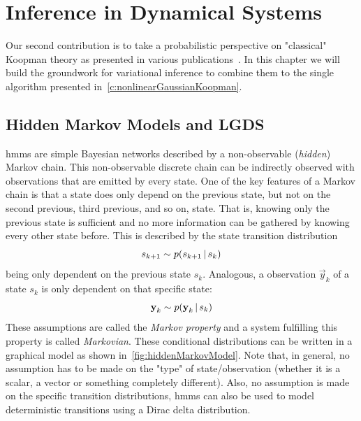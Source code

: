 \chapter{Inference in Dynamical Systems}
\label{c:inferenceInDynamicalSystems}



Our second contribution is to take a probabilistic perspective on "classical" Koopman theory as presented in various publications~\cite{bruntonKoopmanInvariantSubspaces2016,hanDeepLearningKoopman2020,kaiserDatadrivenDiscoveryKoopman2020,luschDeepLearningUniversal2018,williamsDataDrivenApproximation2015}. In this chapter we will build the groundwork for variational inference to combine them to the single \algname algorithm presented in~\autoref{c:nonlinearGaussianKoopman}.

\section{Hidden Markov Models and LGDS}
	\acp{hmm} are simple Bayesian networks described by a non-observable (\emph{hidden}) Markov chain. This non-observable discrete chain can be indirectly observed with observations that are emitted by every state. One of the key features of a Markov chain is that a state does only depend on the previous state, but not on the second previous, third previous, and so on, state. That is, knowing only the previous state is sufficient and no more information can be gathered by knowing every other state before. This is described by the state transition distribution
	\begin{equation*}
		s_{k + 1} \sim p(s_{k + 1} \,\vert\, s_k)
	\end{equation*}
	being only dependent on the previous state \(s_k\). Analogous, a observation \(\vec{y}_k\) of a state \(s_k\) is only dependent on that specific state:
	\begin{equation*}
		\boldsymbol{\mathrm{y}}_k \sim p(\boldsymbol{\mathrm{y}}_k \,\vert\, s_k)
	\end{equation*}
	These assumptions are called the \emph{Markov property} and a system fulfilling this property is called \emph{Markovian}. These conditional distributions can be written in a graphical model as shown in~\autoref{fig:hiddenMarkovModel}. Note that, in general, no assumption has to be made on the "type" of state/observation (\ie whether it is a scalar, a vector or something completely different). Also, no assumption is made on the specific transition distributions, \acp{hmm} can also be used to model deterministic transitions using a Dirac delta distribution.

